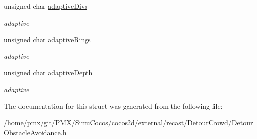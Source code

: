 \begin{DoxyCompactItemize}
\mbox{\label{structdtObstacleAvoidanceParams_a8725d0bb382f789d2dec1d9a0f28187f}} 
unsigned char \hyperlink{structdtObstacleAvoidanceParams_a8725d0bb382f789d2dec1d9a0f28187f}{adaptive\+Divs}
\begin{DoxyCompactList}\small\item\em adaptive \end{DoxyCompactList}\item 
\mbox{\label{structdtObstacleAvoidanceParams_ae463a1999935511e7a0467ccedcaff6d}} 
unsigned char \hyperlink{structdtObstacleAvoidanceParams_ae463a1999935511e7a0467ccedcaff6d}{adaptive\+Rings}
\begin{DoxyCompactList}\small\item\em adaptive \end{DoxyCompactList}\item 
\mbox{\label{structdtObstacleAvoidanceParams_a673b877b64fb47f5bb30f44eae61e5b2}} 
unsigned char \hyperlink{structdtObstacleAvoidanceParams_a673b877b64fb47f5bb30f44eae61e5b2}{adaptive\+Depth}
\begin{DoxyCompactList}\small\item\em adaptive \end{DoxyCompactList}\end{DoxyCompactItemize}


The documentation for this struct was generated from the following file\+:\begin{DoxyCompactItemize}
\item 
/home/pmx/git/\+P\+M\+X/\+Simu\+Cocos/cocos2d/external/recast/\+Detour\+Crowd/Detour\+Obstacle\+Avoidance.\+h\end{DoxyCompactItemize}
